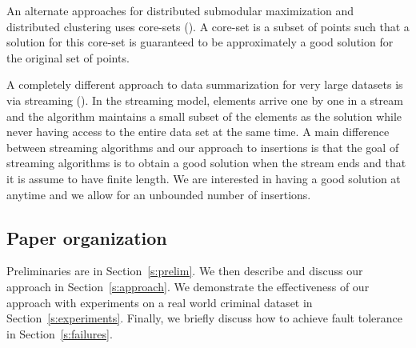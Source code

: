 	An alternate approaches for distributed submodular maximization and distributed clustering uses core-sets (\citet{mirrokni2015randomized, indyk2014composable, balcan2013distributed,bateni2014distributed}). A core-set is a subset of points such that a solution for this core-set is guaranteed to be approximately a good solution for the original set of points.  
	
	A completely different approach to data summarization for very large datasets is via streaming (\citet{badanidiyuru2014streaming,kumar2015fast}). In the streaming model,  elements arrive one by one in a stream and the algorithm maintains a small subset of the elements as the solution while never having access to the entire data set at the same time. A main difference between streaming algorithms and our approach to insertions is that the goal of streaming algorithms is to obtain a good solution when the stream ends and that it is assume to have finite length. We are interested in having a good solution at anytime and we allow for an unbounded number of insertions.
	
	\subsection{Paper organization}
	
	Preliminaries are in Section~\ref{s:prelim}. We then describe and discuss our approach in Section~\ref{s:approach}. We demonstrate the effectiveness of our approach with experiments on a real world criminal dataset in Section~\ref{s:experiments}. Finally, we briefly discuss how to achieve fault tolerance in Section~\ref{s:failures}.
